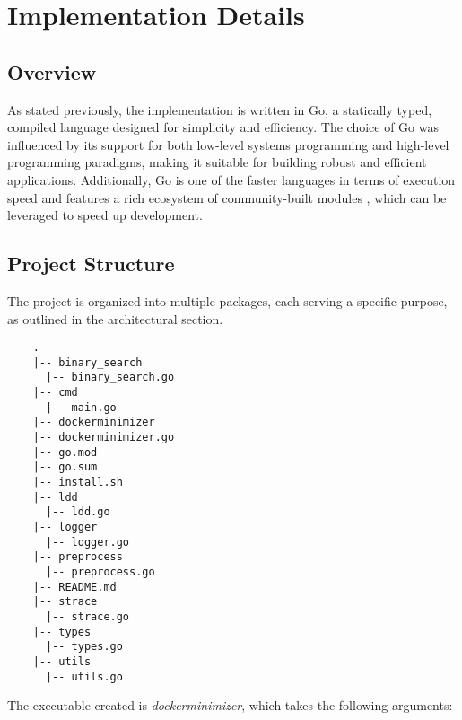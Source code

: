 \chapter{Implementation Details}
\label{chap:implementation-details}

\section{Overview}

As stated previously, the implementation is written in Go, a statically typed, compiled language designed for simplicity and efficiency. The choice of Go was influenced by its 
support for both low-level systems programming and high-level programming paradigms, making it suitable for building robust and efficient applications.
Additionally, Go is one of the faster languages in terms of execution speed and features a rich ecosystem of community-built modules \cite{go-pkg}, which can be leveraged to speed up development.


\pagebreak
\section{Project Structure}

The project is organized into multiple packages, each serving a specific purpose, as outlined in the architectural section.

\lstset{language=bash,caption=Project Structure,label=lst:project-structure}
\begin{lstlisting}
    .
	|-- binary_search
	  |-- binary_search.go
    |-- cmd
      |-- main.go
    |-- dockerminimizer
    |-- dockerminimizer.go
    |-- go.mod
    |-- go.sum
    |-- install.sh
    |-- ldd
      |-- ldd.go
    |-- logger
      |-- logger.go
    |-- preprocess
      |-- preprocess.go
    |-- README.md
    |-- strace
      |-- strace.go
    |-- types
      |-- types.go
    |-- utils
      |-- utils.go
\end{lstlisting}

The executable created is \textit{dockerminimizer}, which takes the following arguments:

